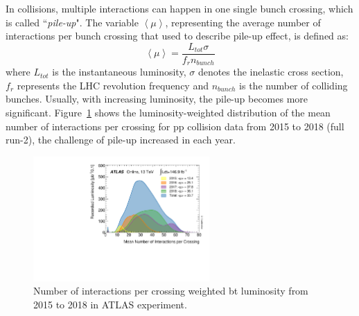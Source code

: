 In collisions, multiple interactions can happen in one single bunch crossing, which is called ``\textit{pile-up}".
The variable $\left< \mu \right>$, representing the average number of interactions per bunch crossing that used to describe pile-up effect, is defined as:
\begin{equation}
	\left< \mu \right> = \frac{L_{tot}\sigma}{f_{r}n_{bunch}}
\end{equation}
where $L_{tot}$ is the instantaneous luminosity, $\sigma$ denotes the inelastic cross section,
$f_{r}$ represents the LHC revolution frequency and $n_{bunch}$ is the number of colliding bunches.
Usually, with increasing luminosity, the pile-up becomes more significant.
Figure~\ref{fig:run2_mu} shows the luminosity-weighted distribution of the mean number of interactions per crossing
for pp collision data from 2015 to 2018 (full run-2), the challenge of pile-up increased in each year.
\begin{figure}[!htb]
  \centering
  \includegraphics[width=0.6\textwidth]{figures/Detector/mu_2015_2018.pdf}
  \caption{Number of interactions per crossing weighted bt luminosity from 2015 to 2018 in ATLAS experiment.}
  \label{fig:run2_mu}
\end{figure}
